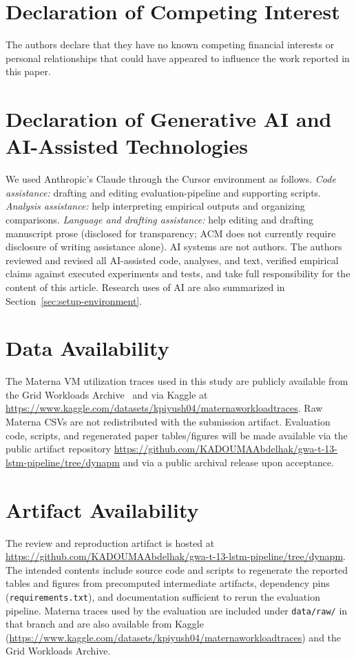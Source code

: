 \documentclass[manuscript,screen,review,anonymous]{acmart}
\begin{document}

\section*{Declaration of Competing Interest}
The authors declare that they have no known competing financial interests
or personal relationships that could have appeared to influence the work
reported in this paper.

\section*{Declaration of Generative AI and AI-Assisted Technologies}
We used Anthropic's Claude through the Cursor environment as follows.
\emph{Code assistance:} drafting and editing evaluation-pipeline and
supporting scripts. \emph{Analysis assistance:} help interpreting
empirical outputs and organizing comparisons. \emph{Language and
drafting assistance:} help editing and drafting manuscript prose
(disclosed for transparency; ACM does not currently require
disclosure of writing assistance alone). AI systems are not authors.
The authors reviewed and revised all AI-assisted code, analyses, and
text, verified empirical claims against executed experiments and
tests, and take full responsibility for the content of this article.
Research uses of AI are also summarized in
Section~\ref{sec:setup-environment}.

\section*{Data Availability}
The Materna VM utilization traces used in this study are publicly
available from the Grid Workloads Archive~\cite{iosup_gwa_2008,materna_trace}
and via Kaggle at
\url{https://www.kaggle.com/datasets/kpiyush04/maternaworkloadtraces}.
Raw Materna CSVs are not redistributed with the submission artifact.
Evaluation code, scripts, and regenerated paper tables/figures will be
made available via the public artifact repository
\url{https://github.com/KADOUMAAbdelhak/gwa-t-13-lstm-pipeline/tree/dynapm}
and via a public archival release upon acceptance.

\section*{Artifact Availability}
The review and reproduction artifact is hosted at
\url{https://github.com/KADOUMAAbdelhak/gwa-t-13-lstm-pipeline/tree/dynapm}.
The intended contents include source code and scripts to regenerate the
reported tables and figures from precomputed intermediate artifacts,
dependency pins (\texttt{requirements.txt}), and documentation sufficient
to rerun the evaluation pipeline. Materna traces used by the evaluation
are included under \texttt{data/raw/} in that branch and are also available
from Kaggle
(\url{https://www.kaggle.com/datasets/kpiyush04/maternaworkloadtraces})
and the Grid Workloads Archive.



\end{document}

